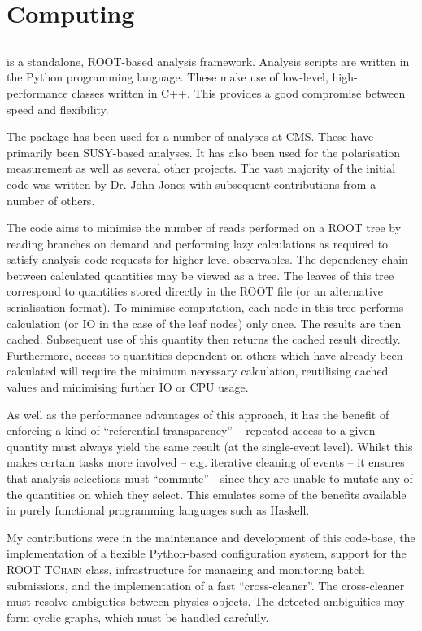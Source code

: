 \chapter{Computing}
\section{}
 is a standalone, \ac{ROOT}-based analysis framework. Analysis
scripts are written in the Python programming language. These make use of
low-level, high-performance classes written in C++. This provides a good
compromise between speed and flexibility.

The  package has been used for a number of analyses at
\ac{CMS}. These have primarily been \ac{SUSY}-based analyses. It has also been
used for the \PW polarisation measurement as well as several other projects. The
vast majority of the initial code was written by Dr. John Jones with subsequent
contributions from a number of others.

The  code aims to minimise the number of reads performed on a
\ac{ROOT} tree by reading branches on demand and performing lazy calculations as
required to satisfy analysis code requests for higher-level observables. The
dependency chain between calculated quantities may be viewed as a tree. The
leaves of this tree correspond to quantities stored directly in the \ac{ROOT}
file (or an alternative serialisation format). To minimise computation, each
node in this tree performs calculation (or \ac{IO} in the case of the leaf nodes)
only once. The results are then cached. Subsequent use of this quantity then
returns the cached result directly. Furthermore, access to quantities dependent
on others which have already been calculated will require the minimum necessary
calculation, reutilising cached values and minimising further \ac{IO} or CPU
usage.

As well as the performance advantages of this approach, it has the benefit of
enforcing a kind of ``referential transparency'' -- repeated access to a given
quantity must always yield the same result (at the single-event level). Whilst
this makes certain tasks more involved -- e.g. iterative cleaning of events --
it ensures that analysis selections must ``commute'' - since they are unable to
mutate any of the quantities on which they select. This emulates some of the
benefits available in purely functional programming languages such as Haskell.

My contributions were in the maintenance and development of this code-base, the
implementation of a flexible Python-based configuration system, support for the
\ac{ROOT} \textsc{TChain} class, infrastructure for managing and monitoring
batch submissions, and the implementation of a fast ``cross-cleaner''. The
cross-cleaner must resolve ambiguties between physics objects. The detected
ambiguities may form cyclic graphs, which must be handled carefully.
